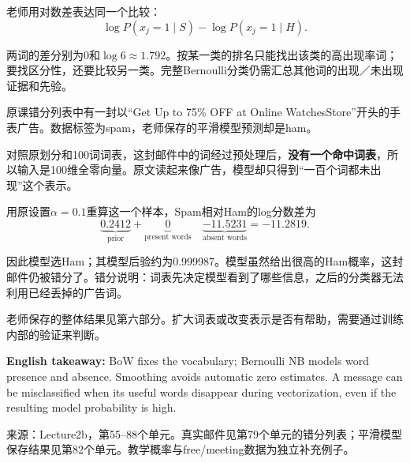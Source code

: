 老师用对数差表达同一个比较：
\[
\log P(x_j=1\mid S)-\log P(x_j=1\mid H).
\tag{2.28}
\]


两词的差分别为0和\(\log6\approx1.792\)。按某一类的排名只能找出该类的高出现率词；要找区分性，还要比较另一类。完整Bernoulli分类仍需汇总其他词的出现／未出现证据和先验。





原课错分列表中有一封以“Get Up to 75\% OFF at Online WatchesStore”开头的手表广告。数据标签为spam，老师保存的平滑模型预测却是ham。


对照原划分和100词词表，这封邮件中的词经过预处理后，\textbf{没有一个命中词表}，所以输入是100维全零向量。原文读起来像广告，模型却只得到“一百个词都未出现”这个表示。


用原设置\(\alpha=0.1\)重算这一个样本，Spam相对Ham的log分数差为
\[
\underbrace{0.2412}_{\text{prior}}
+\underbrace{0}_{\text{present words}}
\quad\underbrace{-11.5231}_{\text{absent words}}
=-11.2819.
\tag{2.29}
\]


因此模型选Ham；其模型后验约为0.999987。模型虽然给出很高的Ham概率，这封邮件仍被错分了。错分说明：词表先决定模型看到了哪些信息，之后的分类器无法利用已经丢掉的广告词。


老师保存的整体结果见第六部分。扩大词表或改变表示是否有帮助，需要通过训练内部的验证来判断。


\textbf{English takeaway:} BoW fixes the vocabulary; Bernoulli NB models word presence and absence. Smoothing avoids automatic zero estimates. A message can be misclassified when its useful words disappear during vectorization, even if the resulting model probability is high.


来源：Lecture2b，第55–88个单元。真实邮件见第79个单元的错分列表；平滑模型保存结果见第82个单元。教学概率与free/meeting数据为独立补充例子。











